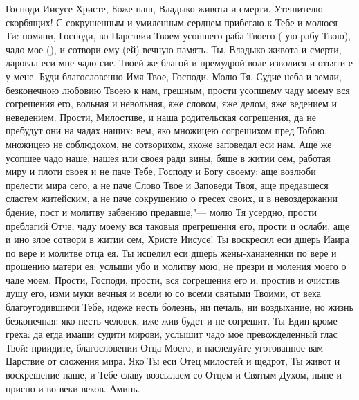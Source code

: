 \begin{mymulticols}
 

Господи Иисусе Христе, Боже наш, Владыко живота и смерти. Утешителю скорбящих! С сокрушенным и умиленным сердцем прибегаю к Тебе и молюся Ти: помяни, Господи, во Царствии Твоем усопшего раба Твоего (-ую рабу Твою), чадо мое (), и сотвори ему (ей) вечную память. Ты, Владыко живота и смерти, даровал еси мне чадо сие. Твоей же благой и премудрой воле изволися и отьяти е у мене. Буди благословенно Имя Твое, Господи. Молю Тя, Судие неба и земли, безконечною любовию Твоею к нам, грешным, прости усопшему чаду моему вся согрешения его, вольная и невольная, яже словом, яже делом, яже ведением и неведением. Прости, Милостиве, и наша родительская согрешения, да не пребудут они на чадах наших: вем, яко множицею согрешихом пред Тобою, множицею не соблюдохом, не сотворихом, якоже заповедал еси нам. Аще же усопшее чадо наше, нашея или своея ради вины, бяше в житии сем, работая миру и плоти своея и не паче Тебе, Господу и Богу своему: аще возлюби прелести мира сего, а не паче Слово Твое и Заповеди Твоя, аще предавшеся сластем житейским, а не паче сокрушению о гресех своих, и в невоздержании бдение, пост и молитву забвению предавше,"--- молю Тя усердно, прости преблагий Отче, чаду моему вся таковыя прегрешения его, прости и ослаби, аще и ино злое сотвори в житии сем, Христе Иисусе! Ты воскресил еси дщерь Иаира по вере и молитве отца ея. Ты исцелил еси дщерь жены-хананеянки по вере и прошению матери ея: услыши убо и молитву мою, не презри и моления моего о чаде моем. Прости, Господи, прости, вся согрешения его и, простив и очистив душу его, изми муки вечныя и всели ю со всеми святыми Твоими, от века благоугодившими Тебе, идеже несть болезнь, ни печаль, ни воздыхание, но жизнь безконечная: яко несть человек, иже жив будет и не согрешит. Ты Един кроме греха: да егда имаши судити мирови, услышит чадо мое превожделенный глас Твой: приидите, благословении Отца Моего, и наследуйте уготованное вам Царствие от сложения мира. Яко Ты еси Отец милостей и щедрот, Ты живот и воскрешение наше, и Тебе славу возсылаем со Отцем и Святым Духом, ныне и присно и во веки веков. Аминь. 

\end{mymulticols}

\mychapterending

